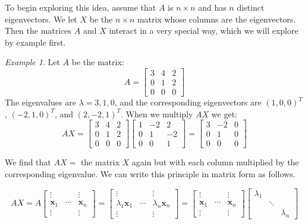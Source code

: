 \documentclass[11pt,oneside]{amsbook}
\theoremstyle{definition}
\theoremstyle{plain}
\theoremstyle{definition}
\theoremstyle{remark}
\newtheorem{example}[theorem]{Example}
\numberwithin{equation}{section}
\numberwithin{figure}{section}
\begin{document}
To begin exploring this idea, assume that $A$ is $n\times n$ and has $n$ distinct eigenvectors. We let $X$ be the $n\times n$ matrix whose columns are the eigenvectors. Then the matrices $A$ and $X$ interact in a very special way, which we will explore by example first.

\begin{example}
  Let $A$ be the matrix:
  \[A=\begin{bmatrix}
      3 & 4 & 2 \\
      0 & 1 & 2 \\
      0 & 0 & 0
      \end{bmatrix}
  \]
  The eigenvalues are $\lambda=3,1,0$, and the corresponding eigenvectors are $(1,0,0)^T$, $(-2,1,0)^T$, and $(2,-2,1)^T$. When we multiply $AX$ we get:
  \[AX=\begin{bmatrix}
      3 & 4 & 2 \\
      0 & 1 & 2 \\
      0 & 0 & 0
    \end{bmatrix}
    \begin{bmatrix}
      1 & -2 & 2 \\
      0 & 1 & -2 \\
      0 & 0 & 1
    \end{bmatrix}
    =
    \begin{bmatrix}
      3 & -2 & 0 \\
      0 & 1 & 0 \\
      0 & 0 & 0
    \end{bmatrix}      
  \]
\end{example}

We find that $AX=$ the matrix $X$ again but with each column multiplied by the corresponding eigenvalue. We can write this principle in matrix form as follows.

\[AX=A\begin{bmatrix}
    \vdots&&\vdots\\
    \mathbf{x}_1&\cdots&\mathbf{x}_n\\
    \vdots&&\vdots
  \end{bmatrix}
  =\begin{bmatrix}
    \vdots&&\vdots\\
    \lambda_1\mathbf{x}_1&\cdots&\lambda_n\mathbf{x}_n\\
    \vdots&&\vdots
  \end{bmatrix}
  =\begin{bmatrix}
    \vdots&&\vdots\\
    \mathbf{x}_1&\cdots&\mathbf{x}_n\\
    \vdots&&\vdots
  \end{bmatrix}
  \begin{bmatrix}
    \lambda_1\\&\ddots&\\&&\lambda_n
  \end{bmatrix}
\]
\end{document}
